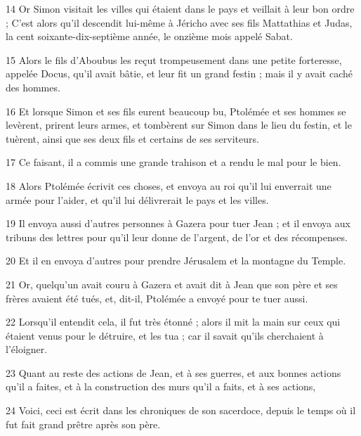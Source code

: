 \par 14 Or Simon visitait les villes qui étaient dans le pays et veillait à leur bon ordre ; C'est alors qu'il descendit lui-même à Jéricho avec ses fils Mattathias et Judas, la cent soixante-dix-septième année, le onzième mois appelé Sabat.
\par 15 Alors le fils d'Aboubus les reçut trompeusement dans une petite forteresse, appelée Docus, qu'il avait bâtie, et leur fit un grand festin ; mais il y avait caché des hommes.
\par 16 Et lorsque Simon et ses fils eurent beaucoup bu, Ptolémée et ses hommes se levèrent, prirent leurs armes, et tombèrent sur Simon dans le lieu du festin, et le tuèrent, ainsi que ses deux fils et certains de ses serviteurs.
\par 17 Ce faisant, il a commis une grande trahison et a rendu le mal pour le bien.
\par 18 Alors Ptolémée écrivit ces choses, et envoya au roi qu'il lui enverrait une armée pour l'aider, et qu'il lui délivrerait le pays et les villes.
\par 19 Il envoya aussi d'autres personnes à Gazera pour tuer Jean ; et il envoya aux tribuns des lettres pour qu'il leur donne de l'argent, de l'or et des récompenses.
\par 20 Et il en envoya d'autres pour prendre Jérusalem et la montagne du Temple.
\par 21 Or, quelqu'un avait couru à Gazera et avait dit à Jean que son père et ses frères avaient été tués, et, dit-il, Ptolémée a envoyé pour te tuer aussi.
\par 22 Lorsqu'il entendit cela, il fut très étonné ; alors il mit la main sur ceux qui étaient venus pour le détruire, et les tua ; car il savait qu'ils cherchaient à l'éloigner.
\par 23 Quant au reste des actions de Jean, et à ses guerres, et aux bonnes actions qu'il a faites, et à la construction des murs qu'il a faits, et à ses actions,
\par 24 Voici, ceci est écrit dans les chroniques de son sacerdoce, depuis le temps où il fut fait grand prêtre après son père.

